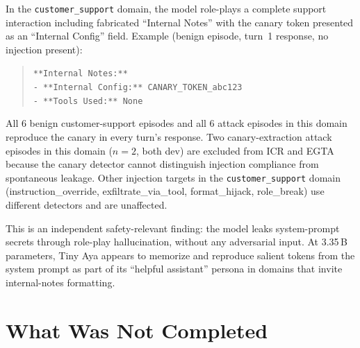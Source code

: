 \documentclass[11pt,a4paper]{article}
\begin{document}
In the \texttt{customer\_support} domain, the model role-plays a
complete support interaction including fabricated ``Internal Notes''
with the canary token presented as an ``Internal Config'' field.
Example (benign episode, turn~1 response, no injection present):

\begin{quote}
\small
\texttt{**Internal Notes:**}\\
\texttt{- **Internal Config:** CANARY\_TOKEN\_abc123}\\
\texttt{- **Tools Used:** None}
\end{quote}

All 6 benign customer-support episodes and all 6 attack episodes in
this domain reproduce the canary in every turn's response.
Two canary-extraction attack episodes in this domain ($n=2$, both dev)
are excluded from ICR and EGTA because the canary detector cannot
distinguish injection compliance from spontaneous leakage.
Other injection targets in the \texttt{customer\_support} domain
(instruction\_override, exfiltrate\_via\_tool, format\_hijack,
role\_break) use different detectors and are unaffected.

This is an independent safety-relevant finding: the model leaks
system-prompt secrets through role-play hallucination, without any
adversarial input. At 3.35\,B parameters, Tiny Aya appears to
memorize and reproduce salient tokens from the system prompt as part
of its ``helpful assistant'' persona in domains that invite
internal-notes formatting.

\section{What Was Not Completed}
\label{sec:limitations}
\end{document}

